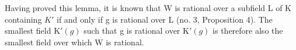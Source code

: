 Having proved this lemma, it is known that W is rational over a subfield L of K containing \(K'\) if and only if g is rational over L (no. 3, Proposition 4). The smallest field \(\mathrm{K}'(g)\) such that g is rational over \(\mathrm{K}'(g)\) is therefore also the smallest field over which W is rational.
